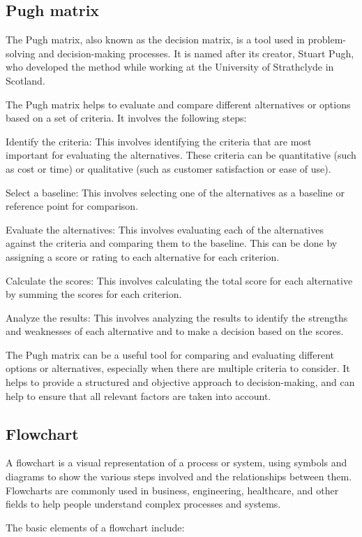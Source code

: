 \documentclass[12pt, a4paper, oneside]{article}
\begin{document}
\subsection{ Pugh matrix }
The Pugh matrix, also known as the decision matrix, is a tool used in problem-solving and decision-making processes. It is named after its creator, Stuart Pugh, who developed the method while working at the University of Strathclyde in Scotland.

The Pugh matrix helps to evaluate and compare different alternatives or options based on a set of criteria. It involves the following steps:

Identify the criteria: This involves identifying the criteria that are most important for evaluating the alternatives. These criteria can be quantitative (such as cost or time) or qualitative (such as customer satisfaction or ease of use).

Select a baseline: This involves selecting one of the alternatives as a baseline or reference point for comparison.

Evaluate the alternatives: This involves evaluating each of the alternatives against the criteria and comparing them to the baseline. This can be done by assigning a score or rating to each alternative for each criterion.

Calculate the scores: This involves calculating the total score for each alternative by summing the scores for each criterion.

Analyze the results: This involves analyzing the results to identify the strengths and weaknesses of each alternative and to make a decision based on the scores.

The Pugh matrix can be a useful tool for comparing and evaluating different options or alternatives, especially when there are multiple criteria to consider. It helps to provide a structured and objective approach to decision-making, and can help to ensure that all relevant factors are taken into account.
\subsection{ Flowchart }
A flowchart is a visual representation of a process or system, using symbols and diagrams to show the various steps involved and the relationships between them. Flowcharts are commonly used in business, engineering, healthcare, and other fields to help people understand complex processes and systems.

The basic elements of a flowchart include:
\end{document}
